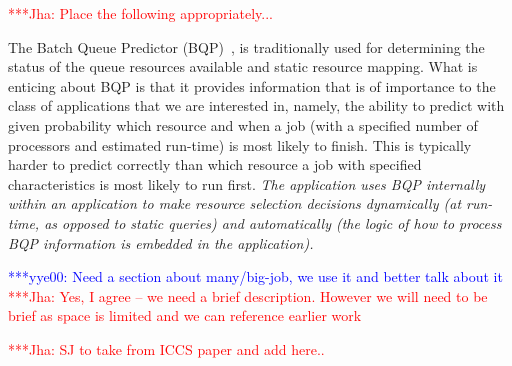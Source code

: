 \documentclass[conference,final]{IEEEtran}
\newcommand{\jhanote}[1]{ {\textcolor{red} { ***Jha: #1 }}}
\newcommand{\yyenote}[1]{ {\textcolor{blue} { ***yye00: #1 }}}
\begin{document}

\jhanote{Place the following appropriately...}

 The Batch
Queue Predictor (BQP)~\cite{bqp, bqp_url}, is traditionally used for
determining the status of the queue resources available and static
resource mapping. What is enticing about BQP is that it provides
information that is of importance to the class of applications that we
are interested in, namely, the ability to predict with given
probability which resource and when a job (with a specified number of
processors and estimated run-time) is most likely to finish.  This is
typically harder to predict correctly than which resource a job with
specified characteristics is most likely to run first.  {\it The
  application uses BQP internally within an application to make
  resource selection decisions dynamically (at run-time, as opposed to
  static queries) and automatically (the logic of how to process BQP
  information is embedded in the application).}

\yyenote{Need a section about many/big-job, we use it and better talk
  about it} \jhanote{Yes, I agree -- we need a brief
  description. However we will need to be brief as space is limited
  and we can reference earlier work}

\jhanote{SJ to take from ICCS paper and add here..}
\end{document}
